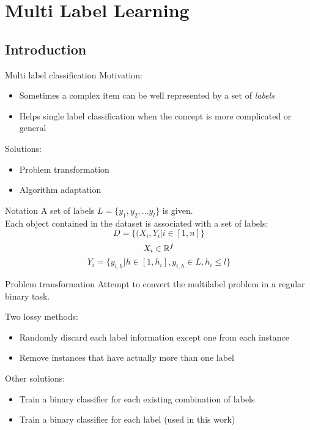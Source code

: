  \section{Multi Label Learning}
 
\subsection*{Introduction}
\begin{frame}{Multi label classification}
	Motivation:
	\begin{itemize}\setlength\itemsep{1em}
		\item Sometimes a complex item can be well represented by a set of \textit{labels}
		\item Helps single label classification when the concept is more complicated or general
	\end{itemize}
	Solutions:
	\begin{itemize}\setlength\itemsep{1em}
		\item Problem transformation
		\item Algorithm adaptation
	\end{itemize}
\end{frame}

\begin{frame}{Notation}
	A set of labels $L = \{y_1, y_2,... y_l\}$ is given.\\
	Each object contained in the dataset is associated with a set of labels:
	$$D = \{(X_i, Y_i | i \in [1, n]\}$$
	$$X_i \in \mathbb{R}^f$$
	$$Y_i = \{y_{i,h} | h \in [1, h_i], y_{i,h} \in L, h_i \leq l\}$$
\end{frame}

\begin{frame}{Problem transformation}
	Attempt to convert the multilabel problem in a regular binary task.
	
	Two lossy methods:
	\begin{itemize}\setlength\itemsep{1em}
		\item Randomly discard each label information except one from each instance
		\item Remove instances that have actually more than one label
	\end{itemize}
	Other solutions:
	\begin{itemize}\setlength\itemsep{1em}
		\item Train a binary classifier for each existing combination of labels
		\item Train a binary classifier for each label (used in this work)
	\end{itemize}
\end{frame}

